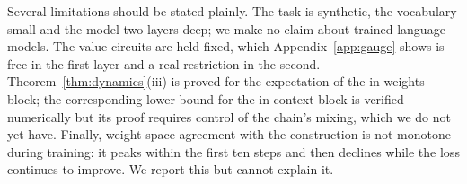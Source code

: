 Several limitations should be stated plainly. The task is synthetic, the vocabulary small and the
model two layers deep; we make no claim about trained language models. The value circuits are
held fixed, which Appendix~\ref{app:gauge} shows is free in the first layer and a real restriction
in the second. Theorem~\ref{thm:dynamics}(iii) is proved for the expectation of the in-weights
block; the corresponding lower bound for the in-context block is verified numerically but its
proof requires control of the chain's mixing, which we do not yet have. Finally, weight-space
agreement with the construction is not monotone during training: it peaks within the first ten
steps and then declines while the loss continues to improve. We report this but cannot explain it.
